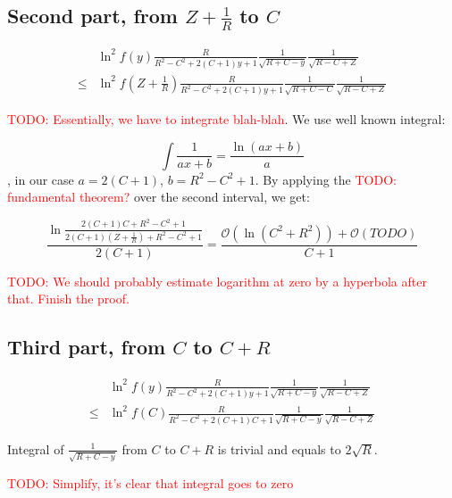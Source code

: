 \documentclass[12pt, a4paper]{article}
\newcommand{\mcO}{\mathcal{O}}
\newcommand{\todo}[1]{{\large \textcolor{red}{TODO: #1}}}
\begin{document}
\subsection*{Second part, from $Z + \frac{1}{R}$ to $C$}

\begin{align*}
       & \ln^2 f(y) \frac{R}{R^2 - C^2 + 2 (C + 1) y + 1} \frac{1}{\sqrt{R + C - y}} \frac{1}{\sqrt{R - C + Z}}
\\ \le & \ln^2 f(Z + \frac{1}{R}) \frac{R}{R^2 - C^2 + 2 (C + 1) y + 1} \frac{1}{\sqrt{R + C - C}} \frac{1}{\sqrt{R - C + Z}}
\end{align*}

\todo{Essentially, we have to integrate blah-blah}. We use well known integral:

\[
\int \frac{1}{a x + b} = \frac{\ln (a x + b)}{a}
\]
, in our case $a = 2 (C + 1)$, $b = R^2 - C^2 + 1$. By applying the \todo{fundamental theorem?} over the second interval, we get:

\[
\frac{\ln \frac{2 (C + 1) C + R^2 - C^2 + 1}{2 (C + 1) (Z + \frac{1}{R}) + R^2 - C^2 + 1}}{2 (C + 1)} = \frac{\mcO(\ln(C^2 + R^2)) + \mcO(TODO)}{C + 1}
\]

\todo{We should probably estimate logarithm at zero by a hyperbola after that. Finish the proof.}

\subsection*{Third part, from $C$ to $C + R$}

\begin{align*}
       & \ln^2 f(y) \frac{R}{R^2 - C^2 + 2 (C + 1) y + 1} \frac{1}{\sqrt{R + C - y}} \frac{1}{\sqrt{R - C + Z}}
\\ \le & \ln^2 f(C) \frac{R}{R^2 - C^2 + 2 (C + 1) C + 1} \frac{1}{\sqrt{R + C - y}} \frac{1}{\sqrt{R - C + Z}}
\end{align*}

Integral of $\frac{1}{\sqrt{R + C - y}}$ from $C$ to $C + R$ is trivial and equals to $2 \sqrt{R}$.

\todo{Simplify, it's clear that integral goes to zero}
\end{document}

